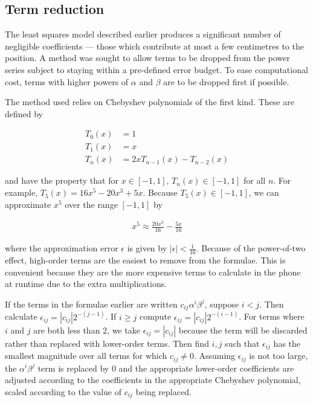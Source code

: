 \documentclass[10pt,a4paper]{article}
\begin{document}
\subsection{Term reduction}
\label{sec:reduction}
The least squares model described earlier produces a significant number of
negligible coefficients --- those which contribute at most a few centimetres to
the position.  A method was sought to allow terms to be dropped from the power
series subject to staying within a pre-defined error budget.  To ease
computational cost, terms with higher powers of $\alpha$ and $\beta$ are to be
dropped first if possible.

The method used relies on Chebyshev polynomials of the first kind.  These are defined by

\begin{align}
  T_0(x) & = 1 \\
  T_1(x) &= x \\
  T_n(x) &= 2xT_{n-1}(x) - T_{n-2}(x)
\end{align}

and have the property that for $x \in [-1,1]$, $T_n(x) \in [-1,1]$ for all $n$.
For example, $T_5(x) = 16x^5 - 20x^3 + 5x$.  Because $T_5(x) \in [-1,1]$, we
can approximate $x^5$ over the range $[-1,1]$ by

\begin{align}
  x^5 \approx \frac{20x^3}{16} - \frac{5x}{16}
\end{align}

where the approximation error $\epsilon$ is given by $|\epsilon| <
\frac{1}{16}$.  Because of the power-of-two effect, high-order terms are the
easiest to remove from the formulae.  This is convenient because they are the
more expensive terms to calculate in the phone at runtime due to the extra
multiplications.

If the terms in the formulae earlier are written $c_{ij}\alpha^i\beta^j$,
suppose $i<j$.  Then calculate $\epsilon_{ij} = |c_{ij}|2^{-(j-1)}$.  If $i\ge j$
compute $\epsilon_{ij} = |c_{ij}|2^{-(i-1)}$.
For terms where $i$ and $j$ are both less than 2, we take $\epsilon_{ij} =
|c_{ij}|$ because the term will be discarded rather than replaced with
lower-order terms.
Then find $i,j$ such that $\epsilon_{ij}$ has the smallest magnitude over all
terms for which $c_{ij} \ne 0$.  Assuming $\epsilon_{ij}$ is not too large, the
$\alpha^i\beta^j$ term is replaced by 0 and the appropriate lower-order
coefficients are adjusted according to the coefficients in the appropriate
Chebyshev polynomial, scaled according to the value of $c_{ij}$ being replaced.
\end{document}
